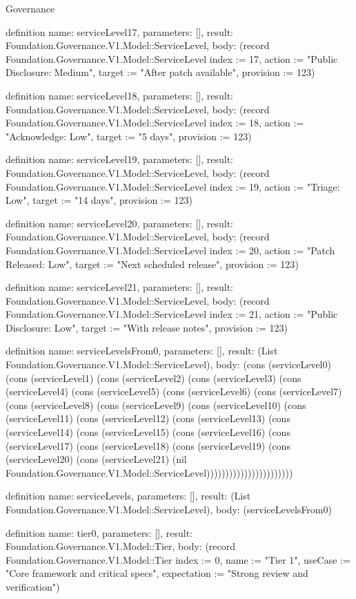 \begin{lexlean}{Governance}
\begin{semanticmodule}
definition{
  name: serviceLevel17,
  parameters: [],
  result: Foundation.Governance.V1.Model::ServiceLevel,
  body: (record Foundation.Governance.V1.Model::ServiceLevel {index := 17, action := "Public Disclosure: Medium", target := "After patch available", provision := 123})
}

definition{
  name: serviceLevel18,
  parameters: [],
  result: Foundation.Governance.V1.Model::ServiceLevel,
  body: (record Foundation.Governance.V1.Model::ServiceLevel {index := 18, action := "Acknowledge: Low", target := "5 days", provision := 123})
}

definition{
  name: serviceLevel19,
  parameters: [],
  result: Foundation.Governance.V1.Model::ServiceLevel,
  body: (record Foundation.Governance.V1.Model::ServiceLevel {index := 19, action := "Triage: Low", target := "14 days", provision := 123})
}

definition{
  name: serviceLevel20,
  parameters: [],
  result: Foundation.Governance.V1.Model::ServiceLevel,
  body: (record Foundation.Governance.V1.Model::ServiceLevel {index := 20, action := "Patch Released: Low", target := "Next scheduled release", provision := 123})
}

definition{
  name: serviceLevel21,
  parameters: [],
  result: Foundation.Governance.V1.Model::ServiceLevel,
  body: (record Foundation.Governance.V1.Model::ServiceLevel {index := 21, action := "Public Disclosure: Low", target := "With release notes", provision := 123})
}

definition{
  name: serviceLevelsFrom0,
  parameters: [],
  result: (List Foundation.Governance.V1.Model::ServiceLevel),
  body: (cons (serviceLevel0) (cons (serviceLevel1) (cons (serviceLevel2) (cons (serviceLevel3) (cons (serviceLevel4) (cons (serviceLevel5) (cons (serviceLevel6) (cons (serviceLevel7) (cons (serviceLevel8) (cons (serviceLevel9) (cons (serviceLevel10) (cons (serviceLevel11) (cons (serviceLevel12) (cons (serviceLevel13) (cons (serviceLevel14) (cons (serviceLevel15) (cons (serviceLevel16) (cons (serviceLevel17) (cons (serviceLevel18) (cons (serviceLevel19) (cons (serviceLevel20) (cons (serviceLevel21) (nil Foundation.Governance.V1.Model::ServiceLevel)))))))))))))))))))))))
}

definition{
  name: serviceLevels,
  parameters: [],
  result: (List Foundation.Governance.V1.Model::ServiceLevel),
  body: (serviceLevelsFrom0)
}

definition{
  name: tier0,
  parameters: [],
  result: Foundation.Governance.V1.Model::Tier,
  body: (record Foundation.Governance.V1.Model::Tier {index := 0, name := "Tier 1", useCase := "Core framework and critical specs", expectation := "Strong review and verification"})
}


\end{semanticmodule}
\end{lexlean}
